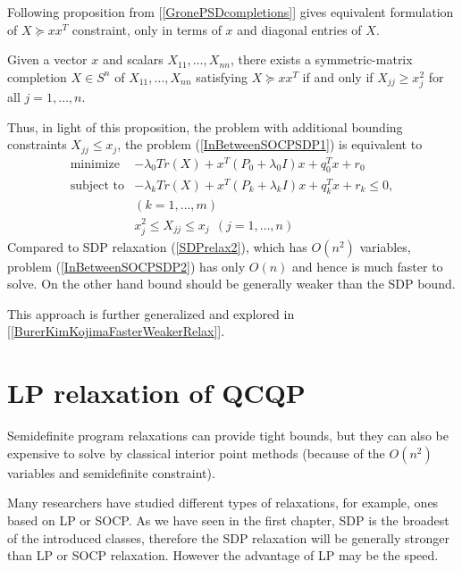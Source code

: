 \documentclass[12pt]{book}
\theoremstyle{definition}
\begin{document}
Following proposition from [\ref{GronePSDcompletions}] gives equivalent formulation of $X\succeq xx^T$ constraint, only in terms of $x$ and diagonal entries of $X$.

\prop[{[\ref{GronePSDcompletions}]}] Given a vector $x$ and scalars $X_{11},\dots ,X_{nn}$, there exists
a symmetric-matrix completion $X\in S^n$ of $X_{11},\dots ,X_{nn}$ satisfying $X \succeq xx^T$ if and only if $X_{jj} \geq x^2_j$ for all $j = 1,\dots ,n.$ \rm 

Thus, in light of this proposition, the problem with additional bounding constraints $X_{jj}\leq x_j$, the problem (\ref{InBetweenSOCPSDP1}) is equivalent to 
\begin{equation}
\label{InBetweenSOCPSDP2}
\begin{array}{ll}
\mbox{minimize}& -\lambda_0 Tr(X) +  x^T(P_0+\lambda_0 I)x + q_0^Tx + r_0 \\
\mbox{subject to}& -\lambda_k Tr(X) +  x^T(P_k+\lambda_kI)x + q_k^Tx + r_k \leq 0, \\ &(k = 1,\dots ,m) \\
& x_j^2\leq X_{jj} \leq x_j \ \ (j = 1,\dots ,n)
\end{array} 
\end{equation}
Compared to SDP relaxation (\ref{SDPrelax2}), which has $O(n^2)$ variables, problem (\ref{InBetweenSOCPSDP2}) has only $O(n)$ and hence is much faster to solve. On the other hand bound should be generally weaker than the SDP bound.

This approach is further generalized and explored in [\ref{BurerKimKojimaFasterWeakerRelax}]. 



\section{LP relaxation of QCQP}

Semidefinite program relaxations can provide tight bounds, but they can also be expensive to solve by classical interior point methods (because of the $O(n^2)$ variables and semidefinite constraint). 

Many researchers have studied different types of relaxations, for example, ones based on LP or SOCP. 
As we have seen in the first chapter, SDP is the broadest of the introduced classes, therefore the SDP relaxation will be generally stronger than LP or SOCP relaxation. However the advantage of LP may be the speed. 
\end{document}
